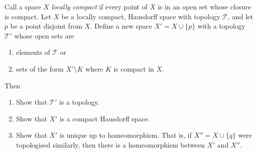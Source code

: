 \documentclass[12 pt, letterpaper]{hmcpset}
\begin{document}
\begin{problem}[Problem 1]
	Call a space $X$ \emph{locally compact} if every point of $X$ is in an open set whose closure is compact. Let $X$ be a locally compact, Hausdorff space with topology $\mathcal{T}$, and let $p$ be a point disjoint from $X$. Define a new space $X' = X \cup \{ p \}$ with a topology $\mathcal{T}'$ whose open sets are
	\begin{enumerate}
		\item[(1)] elements of $\mathcal{T}$ or
		\item[(2)] sets of the form $X' \setminus K$ where $K$ is compact in $X$.
	\end{enumerate}

	Then
	\begin{enumerate}
		\item Show that $\mathcal{T}'$ is a topology.
		\item Show that $X'$ is a compact Hausdorff space.
		\item Show that $X'$ is unique up to homeomorphism. That is, if $X'' = X \cup \{ q \}$ were topologised similarly, then there is a homeomorphism between $X'$ and $X''$.
	\end{enumerate}
\end{problem}
\end{document}
